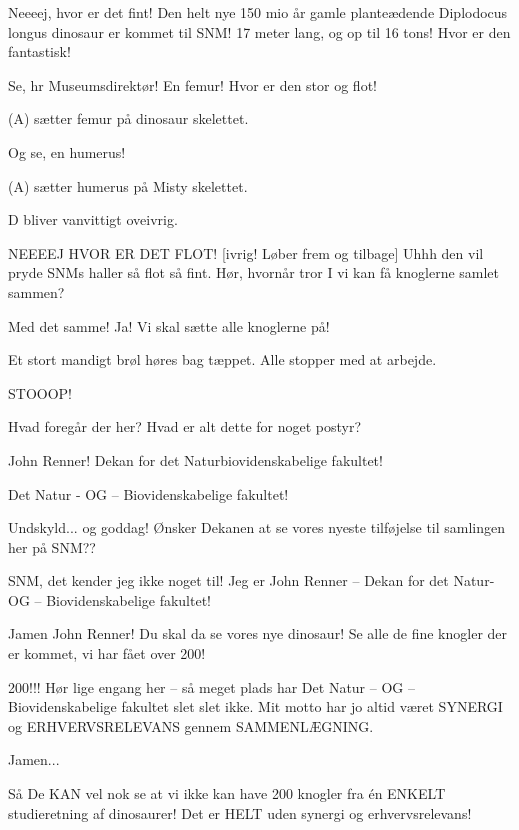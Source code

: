 \documentclass[a4paper,11pt]{article}
\begin{document}
\begin{sketch}


 Neeeej, hvor er det fint! Den helt nye 150 mio år gamle planteædende Diplodocus longus dinosaur er kommet til SNM! 17 meter lang, og op til 16 tons! Hvor er den fantastisk!

 Se, hr Museumsdirektør! En femur! Hvor er den stor og flot!

\scene (A) sætter femur på dinosaur skelettet.

 Og se, en humerus!

\scene (A)  sætter humerus på Misty skelettet.

\scene D bliver vanvittigt oveivrig.

 NEEEEJ HVOR ER DET FLOT! [ivrig! Løber frem og tilbage] Uhhh den vil pryde SNMs haller så flot så fint. Hør, hvornår tror I vi kan få knoglerne samlet sammen?

 Med det samme! Ja! Vi skal sætte alle knoglerne på!

\scene Et stort mandigt brøl høres bag tæppet. Alle stopper med at arbejde.

  STOOOP! 

 Hvad foregår der her? Hvad er alt dette for noget postyr?

 John Renner! Dekan for det Naturbiovidenskabelige fakultet! 

 Det Natur - OG – Biovidenskabelige fakultet!

 Undskyld... og goddag! Ønsker Dekanen at se vores nyeste tilføjelse til samlingen her på SNM??

 SNM, det kender jeg ikke noget til! Jeg er John Renner – Dekan for det Natur- OG – Biovidenskabelige fakultet!

 Jamen John Renner! Du skal da se vores nye dinosaur! Se alle de fine knogler der er kommet, vi har fået over 200! 

 200!!! Hør lige engang her – så meget plads har Det Natur – OG – Biovidenskabelige fakultet slet slet ikke. Mit motto har jo altid været SYNERGI og ERHVERVSRELEVANS gennem SAMMENLÆGNING.

 Jamen...

 Så De KAN vel nok se at vi ikke kan have 200 knogler fra én ENKELT studieretning af dinosaurer! Det er HELT uden synergi og erhvervsrelevans!


\end{sketch}
\end{document}
